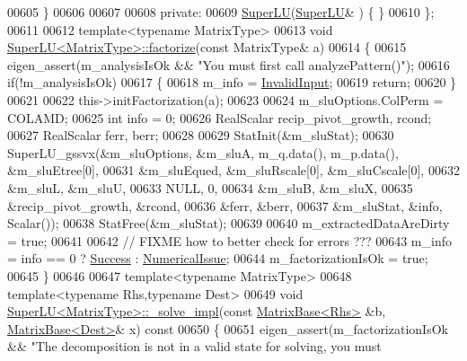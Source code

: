 \begin{DoxyCode}
00605     \}
00606     
00607     
00608   \textcolor{keyword}{private}:
00609     \hyperlink{class_eigen_1_1_super_l_u}{SuperLU}(\hyperlink{class_eigen_1_1_super_l_u}{SuperLU}& ) \{ \}
00610 \};
00611 
00612 \textcolor{keyword}{template}<\textcolor{keyword}{typename} MatrixType>
00613 \textcolor{keywordtype}{void} \hyperlink{class_eigen_1_1_super_l_u_a0b5a5fbda1a1f368003c7c01021a4636}{SuperLU<MatrixType>::factorize}(\textcolor{keyword}{const} MatrixType& a)
00614 \{
00615   eigen\_assert(m\_analysisIsOk && \textcolor{stringliteral}{"You must first call analyzePattern()"});
00616   \textcolor{keywordflow}{if}(!m\_analysisIsOk)
00617   \{
00618     m\_info = \hyperlink{group__enums_gga85fad7b87587764e5cf6b513a9e0ee5ea945604f62795ffc70aedf2bd12ea0434}{InvalidInput};
00619     \textcolor{keywordflow}{return};
00620   \}
00621   
00622   this->initFactorization(a);
00623   
00624   m\_sluOptions.ColPerm = COLAMD;
00625   \textcolor{keywordtype}{int} info = 0;
00626   RealScalar recip\_pivot\_growth, rcond;
00627   RealScalar ferr, berr;
00628 
00629   StatInit(&m\_sluStat);
00630   SuperLU\_gssvx(&m\_sluOptions, &m\_sluA, m\_q.data(), m\_p.data(), &m\_sluEtree[0],
00631                 &m\_sluEqued, &m\_sluRscale[0], &m\_sluCscale[0],
00632                 &m\_sluL, &m\_sluU,
00633                 NULL, 0,
00634                 &m\_sluB, &m\_sluX,
00635                 &recip\_pivot\_growth, &rcond,
00636                 &ferr, &berr,
00637                 &m\_sluStat, &info, Scalar());
00638   StatFree(&m\_sluStat);
00639 
00640   m\_extractedDataAreDirty = \textcolor{keyword}{true};
00641 
00642   \textcolor{comment}{// FIXME how to better check for errors ???}
00643   m\_info = info == 0 ? \hyperlink{group__enums_gga85fad7b87587764e5cf6b513a9e0ee5ea52581b035f4b59c203b8ff999ef5fcea}{Success} : \hyperlink{group__enums_gga85fad7b87587764e5cf6b513a9e0ee5eaaf9b736d310a664e7729d163a035cc5f}{NumericalIssue};
00644   m\_factorizationIsOk = \textcolor{keyword}{true};
00645 \}
00646 
00647 \textcolor{keyword}{template}<\textcolor{keyword}{typename} MatrixType>
00648 \textcolor{keyword}{template}<\textcolor{keyword}{typename} Rhs,\textcolor{keyword}{typename} Dest>
00649 \textcolor{keywordtype}{void} \hyperlink{class_eigen_1_1_super_l_u}{SuperLU<MatrixType>::\_solve\_impl}(\textcolor{keyword}{const} 
      \hyperlink{group___core___module_class_eigen_1_1_matrix_base}{MatrixBase<Rhs>} &b, \hyperlink{group___core___module_class_eigen_1_1_matrix_base}{MatrixBase<Dest>}& x)\textcolor{keyword}{ const}
00650 \textcolor{keyword}{}\{
00651   eigen\_assert(m\_factorizationIsOk && \textcolor{stringliteral}{"The decomposition is not in a valid state for solving, you must
}
\end{DoxyCode}
